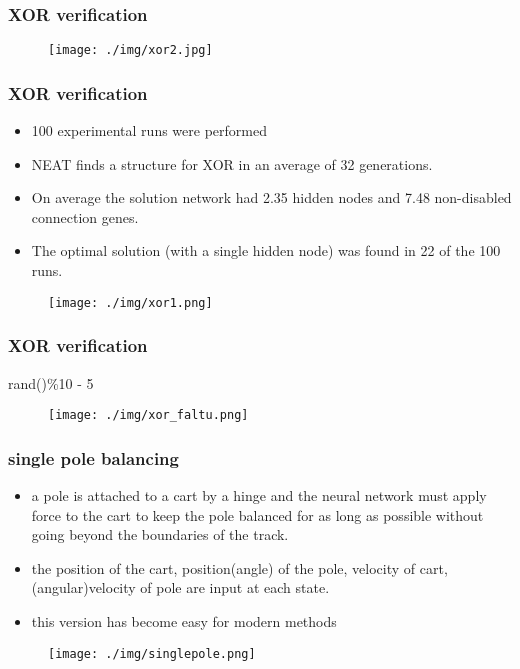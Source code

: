 \documentclass{beamer}
\begin{document}
\begin{frame}
\frametitle{XOR verification}
\begin{figure}
\texttt{[image: ./img/xor2.jpg]}
\end{figure}
\end{frame}

\begin{frame}
\frametitle{XOR verification}
\begin{itemize}
\item 100 experimental runs were performed
\item NEAT finds a structure for XOR in an average of 32 generations.
\item On average the solution network had 2.35 hidden nodes and 7.48 non-disabled connection genes.
\item The optimal solution (with a single hidden node) was found in 22 of the 100 runs.
\end{itemize}
\begin{figure}
\texttt{[image: ./img/xor1.png]}
\end{figure}
\end{frame}

\begin{frame}
\scriptsize
\frametitle{XOR verification}
rand()\%10 - 5
\begin{figure}
\texttt{[image: ./img/xor\_faltu.png]}
\end{figure}
\end{frame}

\begin{frame}
\frametitle{single pole balancing}
\begin{itemize}
\item a pole is attached to a cart by a hinge and the neural network must apply force to the cart to keep the pole balanced for as long as possible without going beyond the boundaries of the track.
\item the position of the cart, position(angle) of the pole, velocity of cart, (angular)velocity of pole are input at each state.
\item this version has become easy for modern methods
\end{itemize}
\begin{figure}
\texttt{[image: ./img/singlepole.png]}
\end{figure}
\end{frame}
\end{document}
